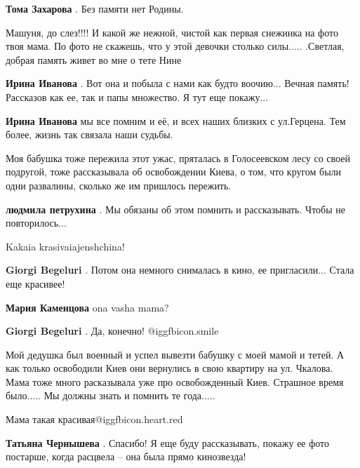 \begin{itemize}
\textbf{Тома Захарова} . Без памяти нет Родины.


Машуня, до слез!!!! И какой же нежной, чистой как первая снежинка на фото твоя
мама. По фото не скажешь, что у этой девочки столько силы..... .Светлая,
добрая память живет во мне о тете Нине

\begin{itemize} %
\textbf{Ирина Иванова} . Вот она и побыла с нами как будто воочию... Вечная память! Рассказов как ее, так и папы множество. Я тут еще покажу...

\textbf{Ирина Иванова} мы все помним и её, и всех наших близких с ул.Герцена. Тем более, жизнь так связала наши судьбы.
\end{itemize} %


Моя бабушка тоже пережила этот ужас, пряталась в Голосеевском лесу со своей
подругой, тоже рассказывала об освобождении Киева, о том, что кругом были одни
развалины, сколько же им пришлось пережить.

\textbf{людмила петрухина} . Мы обязаны об этом помнить и рассказывать. Чтобы не повторилось...

Kakaia krasivaiajenshchina!

\begin{itemize} %
\textbf{Giorgi Begeluri} . Потом она немного снималась в кино, ее пригласили... Стала еще красивее!

\textbf{Мария Каменцова} ona vasha mama?

\textbf{Giorgi Begeluri} . Да, конечно!  @igg{fbicon.smile} 
\end{itemize} %


Мой дедушка был военный и успел вывезти бабушку с моей мамой и тетей. А как
только освободили Киев они вернулись в свою квартиру на ул. Чкалова. Мама тоже
много расказывала уже про освобожденный Киев. Страшное время было..... Мы должны
знать и помнить те года.....


Мама такая красивая@igg{fbicon.heart.red}

\textbf{Татьяна Чернышева} . Спасибо! Я еще буду рассказывать, покажу ее фото постарше, когда расцвела – она была прямо кинозвезда!


\end{itemize}
